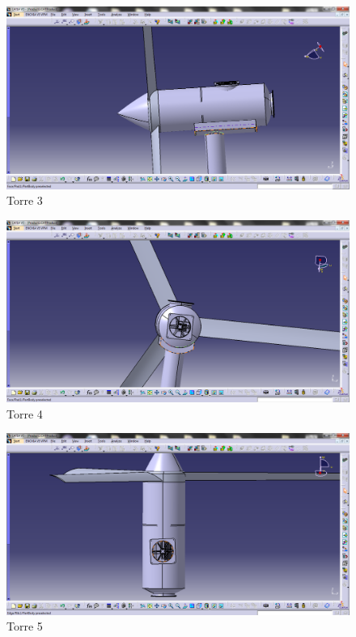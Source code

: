 \begin{figure}[!htbp]
	  \centering
	  \includegraphics[scale=0.45]{editaveis/figuras/C_torre3}
	  \caption[Torre3]{Torre 3}
	  \label{Torre3}
	\end{figure}
	\FloatBarrier
	
\begin{figure}[!htbp]
	  \centering
	  \includegraphics[scale=0.45]{editaveis/figuras/C_torre4}
	  \caption[Torre4]{Torre 4}
	  \label{Torre4}
	\end{figure}
	\FloatBarrier
	
\begin{figure}[!htbp]
	  \centering
	  \includegraphics[scale=0.45]{editaveis/figuras/C_torre5}
	  \caption[Torre5]{Torre 5}
	  \label{Torre2}
	\end{figure}
	\FloatBarrier
	
